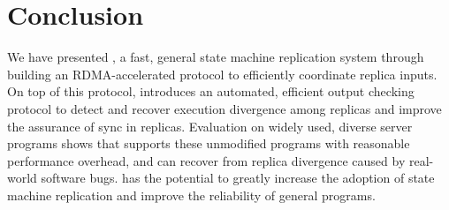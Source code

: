 \section{Conclusion}\label{sec:conclusion}

We have presented \xxx, a fast, general state machine replication system 
through building an RDMA-accelerated \paxos protocol to efficiently coordinate 
replica inputs. On top of this protocol, \xxx introduces an automated, 
efficient output checking protocol to detect and recover execution divergence 
among replicas and improve the assurance of sync in replicas. Evaluation on 
widely used, diverse server programs shows that \xxx supports these unmodified 
programs with reasonable performance overhead, and can recover from replica 
divergence caused by real-world software bugs. \xxx has the potential to 
greatly increase the adoption of state machine replication and improve the 
reliability of general programs.
